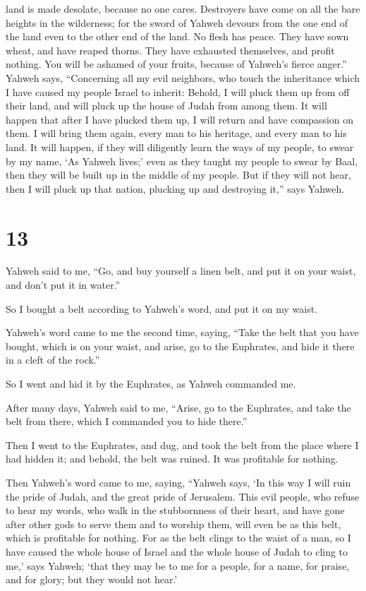 land is made desolate, because no one cares.  Destroyers
have come on all the bare heights in the wilderness; for the sword of
Yahweh devours from the one end of the land even to the other end of the
land. No flesh has peace.  They have sown wheat, and have
reaped thorns. They have exhausted themselves, and profit nothing. You
will be ashamed of your fruits, because of Yahweh's fierce anger.''
 Yahweh says, ``Concerning all my evil neighbors, who touch
the inheritance which I have caused my people Israel to inherit: Behold,
I will pluck them up from off their land, and will pluck up the house of
Judah from among them.  It will happen that after I have
plucked them up, I will return and have compassion on them. I will bring
them again, every man to his heritage, and every man to his land.
 It will happen, if they will diligently learn the ways of
my people, to swear by my name, `As Yahweh lives;' even as they taught
my people to swear by Baal, then they will be built up in the middle of
my people.  But if they will not hear, then I will pluck up
that nation, plucking up and destroying it,'' says Yahweh.

\hypertarget{section-12}{%
\section{13}\label{section-12}}

 Yahweh said to me, ``Go, and buy yourself a linen belt, and
put it on your waist, and don't put it in water.''

 So I bought a belt according to Yahweh's word, and put it
on my waist.

 Yahweh's word came to me the second time, saying,
 ``Take the belt that you have bought, which is on your
waist, and arise, go to the Euphrates, and hide it there in a cleft of
the rock.''

 So I went and hid it by the Euphrates, as Yahweh commanded
me.

 After many days, Yahweh said to me, ``Arise, go to the
Euphrates, and take the belt from there, which I commanded you to hide
there.''

 Then I went to the Euphrates, and dug, and took the belt
from the place where I had hidden it; and behold, the belt was ruined.
It was profitable for nothing.

 Then Yahweh's word came to me, saying, 
``Yahweh says, `In this way I will ruin the pride of Judah, and the
great pride of Jerusalem.  This evil people, who refuse to
hear my words, who walk in the stubbornness of their heart, and have
gone after other gods to serve them and to worship them, will even be as
this belt, which is profitable for nothing.  For as the
belt clings to the waist of a man, so I have caused the whole house of
Israel and the whole house of Judah to cling to me,' says Yahweh; `that
they may be to me for a people, for a name, for praise, and for glory;
but they would not hear.'

